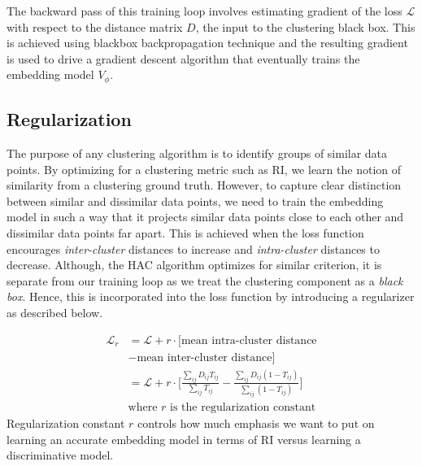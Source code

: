 \documentclass[11pt,a4paper]{article}
\begin{document}
The backward pass of this training loop involves estimating gradient of the loss $\mathcal{L}$ with respect to the distance matrix $D$, the input to the clustering black box. This is achieved using blackbox backpropagation technique and the resulting gradient is used to drive a gradient descent algorithm that eventually trains the embedding model $V_\phi$. 

\subsection{Regularization}\label{sec:reg} The purpose of any clustering algorithm is to identify groups of similar data points. By optimizing for a clustering metric such as RI, we learn the notion of similarity from a clustering ground truth. However, to capture clear distinction between similar and dissimilar data points, we need to train the embedding model in such a way that it projects similar data points close to each other and dissimilar data points far apart. This is achieved when the loss function encourages \textit{inter-cluster} distances to increase and \textit{intra-cluster} distances to decrease. Although, the HAC algorithm optimizes for similar criterion, it is separate from our training loop as we treat the clustering component as a \textit{black box}. Hence, this is incorporated into the loss function by introducing a regularizer as described below.

\begin{align*}
    \mathcal{L}_{r} &= \mathcal{L} + r \cdot [\textrm{mean intra-cluster distance}\\ &- \textrm{mean inter-cluster distance}] \\
    &= \mathcal{L} + r \cdot \Bigg[\frac{\sum_{ij} D_{ij}T_{ij}}{\sum_{ij} T_{ij}} - \frac{\sum_{ij} D_{ij}(1-T_{ij})}{\sum_{ij}(1-T_{ij})}\Bigg] \\
    &\textrm{where $r$ is the regularization constant}
\end{align*}
Regularization constant $r$ controls how much emphasis we want to put on learning an accurate embedding model in terms of RI versus learning a discriminative model.
\end{document}

